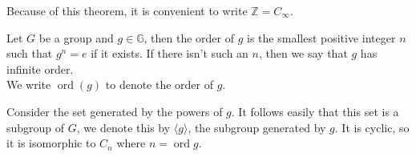 Because of this theorem, it is convenient to write $\mathbb Z=C_\infty$.
\begin{definition}
    Let $G$ be a group and $g\in\mathbb G$, then the order of $g$ is the smallest positive integer $n$ such that $g^n=e$ if it exists.
    If there isn't such an $n$, then we say that $g$ has infinite order.\\
    We write $\operatorname{ord}(g)$ to denote the order of $g$.
\end{definition}
Consider the set generated by the powers of $g$.
It follows easily that this set is a subgroup of $G$, we denote this by $\langle g\rangle$, the subgroup generated by $g$.
It is cyclic, so it is isomorphic to $C_n$ where $n=\operatorname{ord}g$.